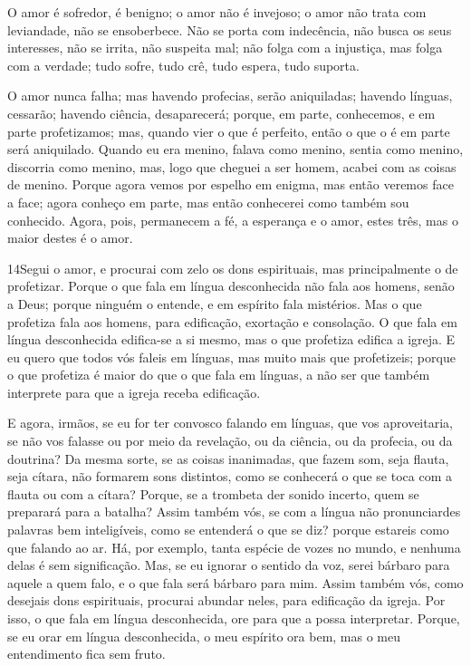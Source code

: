 O amor é sofredor, é benigno; o amor não é invejoso; o amor não
trata com leviandade, não se ensoberbece. Não se porta com
indecência, não busca os seus interesses, não se irrita, não
suspeita mal; não folga com a injustiça, mas folga com a
verdade; tudo sofre, tudo crê, tudo espera, tudo suporta.

O amor nunca falha; mas havendo profecias, serão aniquiladas;
havendo línguas, cessarão; havendo ciência, desaparecerá;
porque, em parte, conhecemos, e em parte profetizamos;
mas, quando vier o que é perfeito, então o que o é em parte
será aniquilado. Quando eu era menino, falava como menino,
sentia como menino, discorria como menino, mas, logo que cheguei a
ser homem, acabei com as coisas de menino. Porque agora vemos
por espelho em enigma, mas então veremos face a face; agora conheço
em parte, mas então conhecerei como também sou conhecido.
Agora, pois, permanecem a fé, a esperança e o amor, estes
três, mas o maior destes é o amor.

\medskip

\lettrine{14} Segui o amor, e procurai com zelo os dons
espirituais, mas principalmente o de profetizar. Porque o que
fala em língua desconhecida não fala aos homens, senão a Deus;
porque ninguém o entende, e em espírito fala mistérios. Mas o
que profetiza fala aos homens, para edificação, exortação e
consolação. O que fala em língua desconhecida edifica-se a si
mesmo, mas o que profetiza edifica a igreja. E eu quero que
todos vós faleis em línguas, mas muito mais que profetizeis; porque
o que profetiza é maior do que o que fala em línguas, a não ser que
também interprete para que a igreja receba edificação.

E agora, irmãos, se eu for ter convosco falando em línguas, que
vos aproveitaria, se não vos falasse ou por meio da revelação, ou da
ciência, ou da profecia, ou da doutrina? Da mesma sorte, se as
coisas inanimadas, que fazem som, seja flauta, seja cítara, não
formarem sons distintos, como se conhecerá o que se toca com a
flauta ou com a cítara? Porque, se a trombeta der sonido
incerto, quem se preparará para a batalha? Assim também vós, se
com a língua não pronunciardes palavras bem inteligíveis, como se
entenderá o que se diz? porque estareis como que falando ao ar.
Há, por exemplo, tanta espécie de vozes no mundo, e nenhuma
delas é sem significação. Mas, se eu ignorar o sentido da
voz, serei bárbaro para aquele a quem falo, e o que fala será
bárbaro para mim. Assim também vós, como desejais dons
espirituais, procurai abundar neles, para edificação da igreja.
Por isso, o que fala em língua desconhecida, ore para que a
possa interpretar. Porque, se eu orar em língua desconhecida,
o meu espírito ora bem, mas o meu entendimento fica sem fruto.

